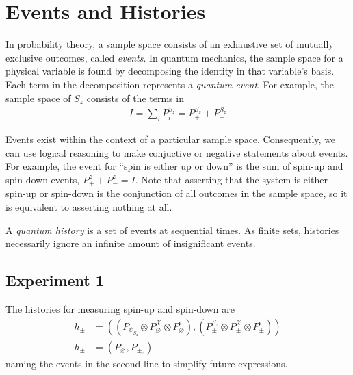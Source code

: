 \section{Events and Histories}

%

In probability theory, a sample space consists of an exhaustive set of mutually exclusive outcomes, called \textit{events}. In quantum mechanics, the sample space for a physical variable is found by decomposing the identity in that variable's basis. Each term in the decomposition represents a \textit{quantum event}. For example, the sample space of $S_z$ consists of the terms in
\begin{align}
  I = \sum_i P^{S_z}_i = P^{S_z}_+ + P^{S_z}_-
\end{align}

Events exist within the context of a particular sample space. Consequently, we can  use logical reasoning to make conjuctive or negative statements about events. For example, the event for ``spin is either up or down'' is the sum of spin-up and spin-down events, $P^z_+ + P^z_- = I$. Note that asserting that the system is either spin-up or spin-down is the conjunction of all outcomes in the sample space, so it is equivalent to asserting nothing at all.

A \textit{quantum history} is a set of events at sequential times. As finite sets, histories necessarily ignore an infinite amount of insignificant events.

\subsection{Experiment 1}
The histories for measuring spin-up and spin-down are
\begin{align}
  h_\pm &= \left( \left(P_{\psi_{S_z}} \otimes P^\mathcal{X}_\varnothing \otimes P^\epsilon_\varnothing \right), \left(P^{S_z}_\pm \otimes P^\mathcal{X}_\pm \otimes P^\epsilon_\pm \right)  \right)  \\ \nonumber
  h_\pm &= \left(P_\varnothing, P_{\pm_z} \right)
\end{align}
naming the events in the second line to simplify future expressions.

